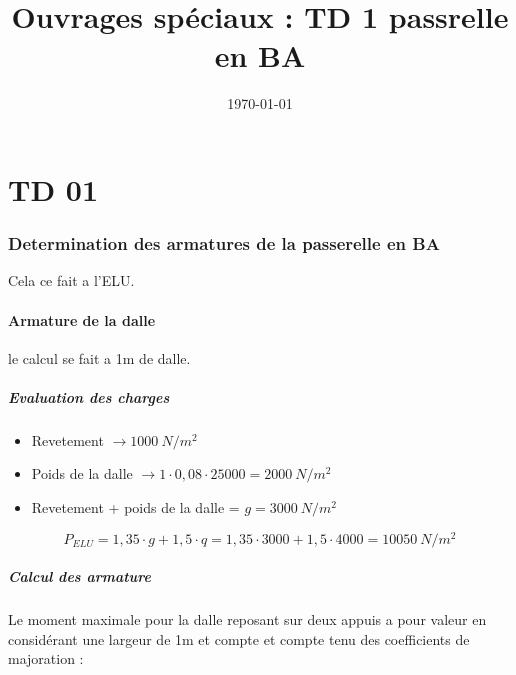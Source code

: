 \documentclass[12pt,a4paper]{article}
\title{Ouvrages spéciaux : TD 1 passrelle en BA}
\author{}
\date{\today}
\begin{document}
	
	
	
	\maketitle
	
	\tableofcontents
	
	\newpage
	
	
	\part{TD 01}
	
	
	
	\section{Determination des armatures de la passerelle en BA}
	
	Cela ce fait a l'ELU.
	
	
	\subsection{Armature de la dalle}
	
	le calcul se fait a 1m de dalle.
	
	\subsubsection{Evaluation des charges}
	
	\begin{itemize}
		\item Revetement $\rightarrow 1000 ~\unit{N\per m^{2}} $
		\item Poids de la dalle $\rightarrow 1 \cdot 0,08 \cdot 25000 = 2000 ~\unit{N\per m^{2}} $ 
		\item Revetement + poids de la dalle = $ g = 3000 ~\unit{N\per m^{2}} $ 
	\end{itemize}
	
	\[ P_{ELU}  =  1,35 \cdot g  +  1,5 \cdot q  = 1,35 \cdot 3000  + 1,5 \cdot 4000  = 10050 ~\unit{N\per m^{2}} \]
	
	\vspace{\baselineskip}
	
	\subsubsection{Calcul des armature}
	
	Le moment maximale pour la dalle reposant sur deux appuis a pour valeur en considérant une largeur de 1m et compte et compte tenu des coefficients de majoration : 
	
\end{document}
